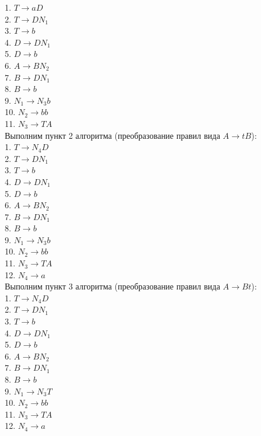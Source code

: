 \documentclass[a4paper,14pt]{extarticle}
\begin{document}
\begin{enumerate}[1.]
1. $T \rightarrow aD$\\
2. $T \rightarrow DN_1$\\
3. $T \rightarrow b$\\
4. $D \rightarrow DN_1$\\
5. $D \rightarrow b$\\
6. $A \rightarrow BN_2$\\
7. $B \rightarrow DN_1$\\
8. $B \rightarrow b$\\
9. $N_1 \rightarrow N_3b$\\
10. $N_2 \rightarrow bb$\\
11. $N_3 \rightarrow TA$\\

Выполним пункт 2 алгоритма (преобразование правил вида $A \rightarrow tB$):\\
1. $T \rightarrow N_4D$\\
2. $T \rightarrow DN_1$\\
3. $T \rightarrow b$\\
4. $D \rightarrow DN_1$\\
5. $D \rightarrow b$\\
6. $A \rightarrow BN_2$\\
7. $B \rightarrow DN_1$\\
8. $B \rightarrow b$\\
9. $N_1 \rightarrow N_3b$\\
10. $N_2 \rightarrow bb$\\
11. $N_3 \rightarrow TA$\\
12. $N_4 \rightarrow a$\\

Выполним пункт 3 алгоритма (преобразование правил вида $A \rightarrow Bt$):\\
1. $T \rightarrow N_4D$\\
2. $T \rightarrow DN_1$\\
3. $T \rightarrow b$\\
4. $D \rightarrow DN_1$\\
5. $D \rightarrow b$\\
6. $A \rightarrow BN_2$\\
7. $B \rightarrow DN_1$\\
8. $B \rightarrow b$\\
9. $N_1 \rightarrow N_3T$\\
10. $N_2 \rightarrow bb$\\
11. $N_3 \rightarrow TA$\\
12. $N_4 \rightarrow a$\\


\end{enumerate}
\end{document}

